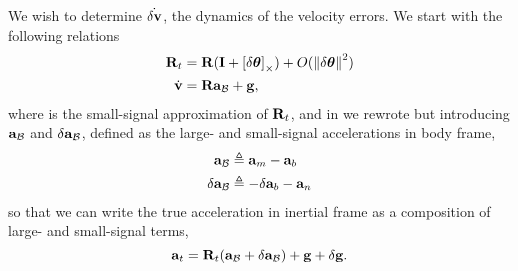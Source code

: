 We wish to determine $\dot{\delta{\bf v}}$, the dynamics of the velocity errors. 
We start with the following relations
%
%
\begin{align}
{\bf R}_t &= {\bf R}({\bf I}+\left[\delta{\bm \theta}\right]_\times)  + O({\left\|\delta{\bm \theta}\right\|}^2) \label{equ:Rt}\\
\dot{{\bf v}} &= {\bf R}{\bf a}_{\mathcal{B}} + {\bf g}, \label{equ:vdot2}
\end{align}%
%
where  is the small-signal approximation of ${\bf R}_t$, and in  we rewrote  but introducing ${\bf a}_{\mathcal{B}}$ and $\delta{\bf a}_{\mathcal{B}}$, defined as the large- and small-signal accelerations in body frame,
%
%
\begin{align}
{\bf a}_{\mathcal{B}} &\triangleq {\bf a}_m - {\bf a}_b \label{equ:nomacc}\\
\delta{\bf a}_{\mathcal{B}} &\triangleq -\delta{\bf a}_b - {\bf a}_n  \label{equ:pertacc}
\end{align}%
%
so that we can write the true acceleration in inertial frame as a composition of large- and small-signal terms,
%
\begin{equation}
{\bf a}_t = {\bf R}_t({\bf a}_{\mathcal{B}}+\delta{\bf a}_{\mathcal{B}}) + {\bf g} + \delta{\bf g}.
\end{equation}%

